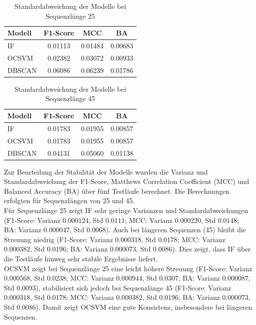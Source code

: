\documentclass[a4paper,12pt]{article}
\begin{document}
	\begin{table}[H]
		\centering
		\caption{Standardabweichung der Modelle bei Sequenzlänge 25}
		\begin{tabular}{lccc}
			\hline
			Modell & F1-Score & MCC & BA \\
			\hline
			IF     & 0.01113 & 0.01484 & 0.00683 \\
			OCSVM  & 0.02382 & 0.03072 & 0.00933 \\
			DBSCAN & 0.06086 & 0.06239 & 0.01786 \\
			\hline
		\end{tabular}
	\end{table}
	
	\begin{table}[H]
		\centering
		\caption{Standardabweichung der Modelle bei Sequenzlänge 45}
		\begin{tabular}{lccc}
			\hline
			Modell & F1-Score & MCC & BA \\
			\hline
			IF     & 0.01783 & 0.01955 & 0.00857 \\
			OCSVM  & 0.01783 & 0.01955 & 0.00857 \\
			DBSCAN & 0.04131 & 0.05060 & 0.01138 \\
			\hline
		\end{tabular}
	\end{table}
	Zur Beurteilung der Stabilität der Modelle wurden die Varianz und Standardabweichung der F1-Score, Matthews Correlation Coefficient (MCC) und Balanced Accuracy (BA) über fünf Testläufe berechnet. Die Berechnungen erfolgten für Sequenzlängen von 25 und 45.
	\\[0.5em]
	Für Sequenzlänge 25 zeigt IF sehr geringe Varianzen und Standardabweichungen (F1-Score: Varianz $0.000124$, Std $0.0111$; MCC: Varianz $0.000220$, Std $0.0148$; BA: Varianz $0.000047$, Std $0.0068$). Auch bei längeren Sequenzen (45) bleibt die Streuung niedrig (F1-Score: Varianz $0.000318$, Std $0.0178$; MCC: Varianz $0.000382$, Std $0.0196$; BA: Varianz $0.000073$, Std $0.0086$). Dies zeigt, dass IF über die Testläufe hinweg sehr stabile Ergebnisse liefert.
	\\[0.5em]
	OCSVM zeigt bei Sequenzlänge 25 eine leicht höhere Streuung (F1-Score: Varianz $0.000568$, Std $0.0238$; MCC: Varianz $0.000944$, Std $0.0307$; BA: Varianz $0.000087$, Std $0.0093$), stabilisiert sich jedoch bei Sequenzlänge 45 (F1-Score: Varianz $0.000318$, Std $0.0178$; MCC: Varianz $0.000382$, Std $0.0196$; BA: Varianz $0.000073$, Std $0.0086$). Damit zeigt OCSVM eine gute Konsistenz, insbesondere bei längeren Sequenzen.
\end{document}
